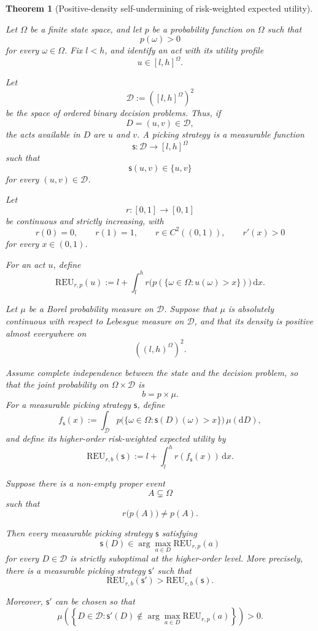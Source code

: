 \documentclass[a4paper,final]{article}
\newtheorem{theorem}{Theorem}[section]
\newcommand\REU{\mathrm{REU}}
\newcommand{\Decs}{\mathcal{D}}
\newcommand\s{\mathsf{s}}
\newenvironment{CCM rewritten}
{\begingroup\color{blue}} %
{\endgroup}              %
\begin{document}
\begin{theorem}[Positive-density self-undermining of risk-weighted expected utility]
\label{thm:reu-positive-density}

Let $\Omega$ be a finite state space, and let $p$ be a probability
function on $\Omega$ such that
\[
p(\omega)>0
\]
for every $\omega\in\Omega$. Fix $l<h$, and identify an act with its
utility profile
\[
u\in[l,h]^\Omega.
\]

Let
\[
\Decs:=([l,h]^\Omega)^2
\]
be the space of ordered binary decision problems. Thus, if
\[
D=(u,v)\in\Decs,
\]
the acts available in $D$ are $u$ and $v$. A picking strategy is a
measurable function
\[
\s:\Decs\longrightarrow[l,h]^\Omega
\]
such that
\[
\s(u,v)\in\{u,v\}
\]
for every $(u,v)\in\Decs$.

Let
\[
r:[0,1]\longrightarrow[0,1]
\]
be continuous and strictly increasing, with
\[
r(0)=0,
\qquad
r(1)=1,
\qquad
r\in C^2((0,1)),
\qquad
r'(x)>0
\]
for every $x\in(0,1)$.

For an act $u$, define
\[
\REU_{r,p}(u)
:=
l+\int_l^h
r\bigl(p(\{\omega\in\Omega:u(\omega)>x\})\bigr)
\,\mathrm{d}x.
\]

Let $\mu$ be a Borel probability measure on $\Decs$. Suppose that
$\mu$ is absolutely continuous with respect to Lebesgue measure on
$\Decs$, and that its density is positive almost everywhere on
\[
((l,h)^\Omega)^2.
\]

Assume complete independence between the state and the decision
problem, so that the joint probability on $\Omega\times\Decs$ is
\[
b=p\times\mu.
\]
For a measurable picking strategy $\s$, define
\[
f_\s(x)
:=
\int_{\Decs}
p\bigl(\{\omega\in\Omega:\s(D)(\omega)>x\}\bigr)
\,\mu(\mathrm{d}D),
\]
and define its higher-order risk-weighted expected utility by
\[
\REU_{r,b}(\s)
:=
l+\int_l^h r(f_\s(x))\,\mathrm{d}x.
\]

Suppose there is a non-empty proper event
\[
A\subsetneq\Omega
\]
such that
\[
r\bigl(p(A)\bigr)\neq p(A).
\]

Then every measurable picking strategy $\s$ satisfying
\[
\s(D)\in
\arg\max_{a\in D}\REU_{r,p}(a)
\]
for every $D\in\Decs$ is strictly suboptimal at the higher-order
level. More precisely, there is a measurable picking strategy $\s'$
such that
\[
\REU_{r,b}(\s')>\REU_{r,b}(\s).
\]

Moreover, $\s'$ can be chosen so that
\[
\mu\left(
\left\{
D\in\Decs:
\s'(D)\notin
\arg\max_{a\in D}\REU_{r,p}(a)
\right\}
\right)>0.
\]
\end{theorem}
\end{document}
